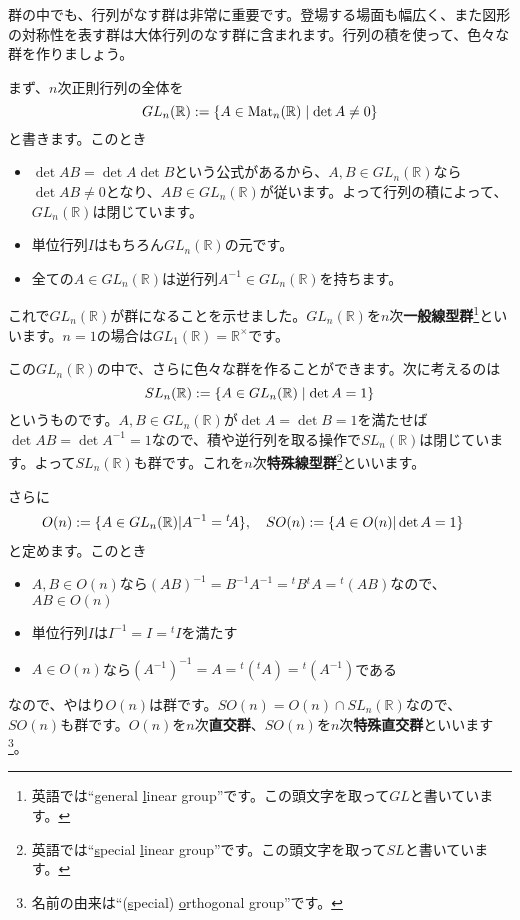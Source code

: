 群の中でも、行列がなす群は非常に重要です。登場する場面も幅広く、また図形の対称性を表す群は大体行列のなす群に含まれます。行列の積を使って、色々な群を作りましょう。


まず、$n$次正則行列の全体を
\[
GL_n(\mathbb{R}) := \{ A \in \operatorname{Mat}_n(\mathbb{R}) \mid \det A \neq 0 \}
\]
と書きます。このとき
\begin{itemize}
\item $\det AB = \det A \det B$という公式があるから、$A, B \in GL_n(\mathbb{R})$なら$\det AB \neq 0$となり、$AB \in GL_n(\mathbb{R})$が従います。よって行列の積によって、$GL_n(\mathbb{R})$は閉じています。
\item 単位行列$I$はもちろん$GL_n(\mathbb{R})$の元です。
\item 全ての$A \in GL_n(\mathbb{R})$は逆行列$A^{-1} \in GL_n(\mathbb{R})$を持ちます。
\end{itemize}
これで$GL_n(\mathbb{R})$が群になることを示せました。$GL_n(\mathbb{R})$を$n$次\textbf{一般線型群}\footnote{英語では``\uline{g}eneral \uline{l}inear group''です。この頭文字を取って$GL$と書いています。}といいます。$n = 1$の場合は$GL_1(\mathbb{R}) = \mathbb{R}^{\times}$です。

この$GL_n(\mathbb{R})$の中で、さらに色々な群を作ることができます。次に考えるのは
\[
SL_n(\mathbb{R}) := \{ A \in GL_n(\mathbb{R}) \mid \det A = 1\}\index{SLn@$SL_n$}
\]
というものです。$A, B \in GL_n(\mathbb{R})$が$\det A = \det B = 1$を満たせば$\det AB = \det A^{-1} = 1$なので、積や逆行列を取る操作で$SL_n(\mathbb{R})$は閉じています。よって$SL_n(\mathbb{R})$も群です。これを$n$次\textbf{特殊線型群}\footnote{英語では``\uline{s}pecial \uline{l}inear group''です。この頭文字を取って$SL$と書いています。}といいます。

さらに
\begin{align*}
O(n) &:= \{A \in GL_n(\mathbb{R}) | A^{-1} = {}^t\!A \}\index{On@$O(n)$}, \quad
SO(n) := \{A \in O(n) | \det A = 1 \}\index{SOn@$SO(n)$}
\end{align*}
と定めます。このとき
\begin{itemize}
\item $A, B \in O(n)$なら$(AB)^{-1} = B^{-1} A^{-1} = {}^tB {}^t\!A = {}^t(AB)$なので、$AB \in O(n)$
\item 単位行列$I$は$I^{-1} = I = {}^t I$を満たす
\item $A \in O(n)$なら$(A^{-1})^{-1} = A = {}^t({}^t\!A) = {}^t(A^{-1})$である
\end{itemize}
なので、やはり$O(n)$は群です。$SO(n) = O(n) \cap SL_n(\mathbb{R})$なので、$SO(n)$も群です。$O(n)$を$n$次\textbf{直交群}、$SO(n)$を$n$次\textbf{特殊直交群}といいます\footnote{名前の由来は``(\uline{s}pecial) \uline{o}rthogonal group''です。}。

